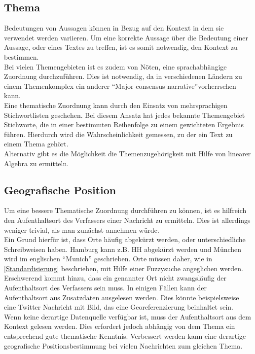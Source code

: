 \documentclass[twoside,a4paper]{article}
\begin{document}
\subsection{Thema}
Bedeutungen von Aussagen können in Bezug auf den Kontext in dem sie verwendet werden variieren. Um eine korrekte Aussage über die Bedeutung einer Aussage, oder eines Textes zu treffen, ist es somit notwendig, den Kontext zu bestimmen.\\
Bei vielen Themengebieten ist es zudem von Nöten, eine sprachabhängige Zuordnung durchzuführen. Dies ist notwendig, da in verschiedenen Ländern zu einem Themenkomplex ein anderer \enquote{Major consensus narrative}\footnotemark vorherrschen kann.\\
\noindent Eine thematische Zuordnung kann durch den Einsatz von mehrsprachigen Stichwortlisten geschehen. Bei diesem Ansatz hat jedes bekannte Themengebiet Stichworte, die in einer bestimmten Reihenfolge zu einem gewichteten Ergebnis führen. Hierdurch wird die Wahrscheinlichkeit gemessen, zu der ein Text zu einem Thema gehört.\\
Alternativ gibt es die Möglichkeit die Themenzugehörigkeit mit Hilfe von linearer Algebra zu ermitteln.


\subsection{Geografische Position}
Um eine bessere Thematische Zuordnung durchführen zu können, ist es hilfreich den Aufenthaltsort des Verfassers einer Nachricht zu ermitteln. Dies ist allerdings weniger trivial, als man zunächst annehmen würde.\\
\noindent Ein Grund hierfür ist, dass Orte häufig abgekürzt werden, oder unterschiedliche Schreibweisen haben. Hamburg kann z.B. HH abgekürzt werden und München wird im englischen \enquote{Munich} geschrieben. Orte müssen daher, wie in \ref{Standardisierung} beschrieben, mit Hilfe einer Fuzzysuche angeglichen werden.\\
Erschwerend kommt hinzu, dass ein genannter Ort nicht zwangsläufig der Aufenthaltsort des Verfassers sein muss. In einigen Fällen kann der Aufenthaltsort aus Zusatzdaten ausgelesen werden. Dies könnte beispielsweise eine Twitter Nachricht mit Bild, das eine Georeferenzierung beinhaltet sein.\\
Wenn keine derartige Datenquelle verfügbar ist, muss der Aufenthaltsort aus dem Kontext gelesen werden. Dies erfordert jedoch abhängig von dem Thema ein entsprechend gute thematische Kenntnis. Verbessert werden kann eine derartige geografische Positionsbestimmung bei vielen Nachrichten zum gleichen Thema. 
\end{document}
